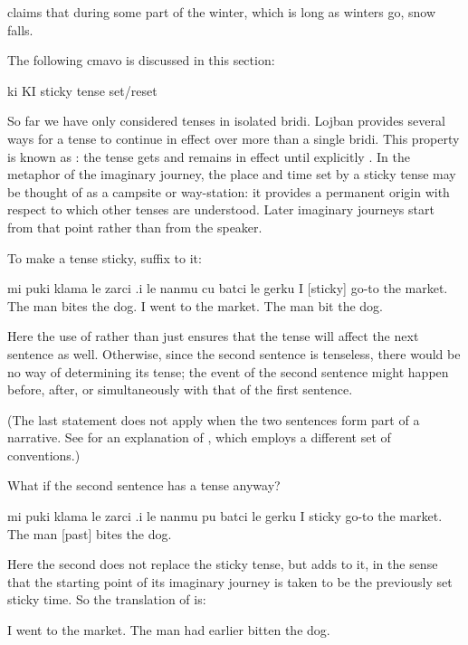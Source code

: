 {\noindent}claims that during some part of the winter, which is long as
    winters go, snow falls.



The following cmavo is discussed in this section:

   ki  KI  sticky tense set/reset

So far we have only considered tenses in isolated bridi. Lojban
    provides several ways for a tense to continue in effect over
    more than a single bridi. This property is known as
    : the tense gets  and remains in effect
    until explicitly . In the metaphor of the imaginary
    journey, the place and time set by a sticky tense may be
    thought of as a campsite or way-station: it provides a
    permanent origin with respect to which other tenses are
    understood. Later imaginary journeys start from that point
    rather than from the speaker. 

To make a tense sticky, suffix  to it:
\begin{example}
mi puki klama le zarci\n
\T	.i le nanmu cu batci le gerku\n
I  [sticky] go-to the market.\n
\T	The man bites the dog.\n
I went to the market.  The man bit the dog.
\end{example}

Here the use of  rather than just  ensures
    that the tense will affect the next sentence as well.
    Otherwise, since the second sentence is tenseless, there would
    be no way of determining its tense; the event of the second
    sentence might happen before, after, or simultaneously with
    that of the first sentence.

(The last statement does not apply when the two sentences
    form part of a narrative. See  for
    an explanation of , which employs a different set
    of conventions.)

What if the second sentence has a tense anyway?
\begin{example}
mi puki klama le zarci\n
\T	.i le nanmu pu batci le gerku\n
I  sticky go-to the market.\n
\T	The man [past] bites the dog.
\end{example}

Here the second  does not replace the sticky tense,
    but adds to it, in the sense that the starting point of its
    imaginary journey is taken to be the previously set sticky
    time. So the translation of 
    is:
\begin{example}
I went to the market.\n
\T	The man had earlier bitten the dog.
\end{example}

